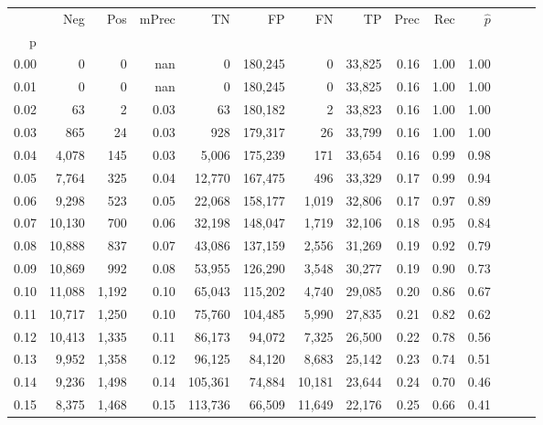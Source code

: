 \begin{tabular}{rrrrrrrrrrrrrr}
\toprule
{} &     Neg &    Pos & mPrec &       TN &       FP &      FN &      TP &  Prec &   Rec & $\hat{p}$ \\
p    &         &        &       &          &          &         &         &       &       &           \\
\midrule
0.00 &       0 &      0 &   nan &        0 &  180,245 &       0 &  33,825 &  0.16 &  1.00 &      1.00 \\
0.01 &       0 &      0 &   nan &        0 &  180,245 &       0 &  33,825 &  0.16 &  1.00 &      1.00 \\
0.02 &      63 &      2 &  0.03 &       63 &  180,182 &       2 &  33,823 &  0.16 &  1.00 &      1.00 \\
0.03 &     865 &     24 &  0.03 &      928 &  179,317 &      26 &  33,799 &  0.16 &  1.00 &      1.00 \\
0.04 &   4,078 &    145 &  0.03 &    5,006 &  175,239 &     171 &  33,654 &  0.16 &  0.99 &      0.98 \\
0.05 &   7,764 &    325 &  0.04 &   12,770 &  167,475 &     496 &  33,329 &  0.17 &  0.99 &      0.94 \\
0.06 &   9,298 &    523 &  0.05 &   22,068 &  158,177 &   1,019 &  32,806 &  0.17 &  0.97 &      0.89 \\
0.07 &  10,130 &    700 &  0.06 &   32,198 &  148,047 &   1,719 &  32,106 &  0.18 &  0.95 &      0.84 \\
0.08 &  10,888 &    837 &  0.07 &   43,086 &  137,159 &   2,556 &  31,269 &  0.19 &  0.92 &      0.79 \\
0.09 &  10,869 &    992 &  0.08 &   53,955 &  126,290 &   3,548 &  30,277 &  0.19 &  0.90 &      0.73 \\
0.10 &  11,088 &  1,192 &  0.10 &   65,043 &  115,202 &   4,740 &  29,085 &  0.20 &  0.86 &      0.67 \\
0.11 &  10,717 &  1,250 &  0.10 &   75,760 &  104,485 &   5,990 &  27,835 &  0.21 &  0.82 &      0.62 \\
0.12 &  10,413 &  1,335 &  0.11 &   86,173 &   94,072 &   7,325 &  26,500 &  0.22 &  0.78 &      0.56 \\
0.13 &   9,952 &  1,358 &  0.12 &   96,125 &   84,120 &   8,683 &  25,142 &  0.23 &  0.74 &      0.51 \\
0.14 &   9,236 &  1,498 &  0.14 &  105,361 &   74,884 &  10,181 &  23,644 &  0.24 &  0.70 &      0.46 \\
0.15 &   8,375 &  1,468 &  0.15 &  113,736 &   66,509 &  11,649 &  22,176 &  0.25 &  0.66 &      0.41 \\

\end{tabular}
